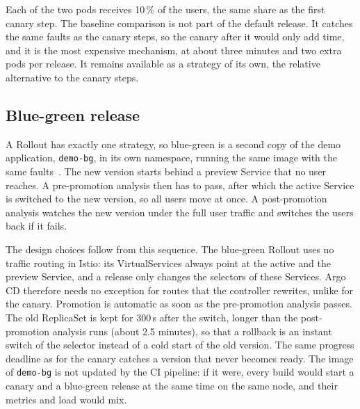 Each of the two pods receives 10\,\% of the users, the same share as the first canary step. The baseline comparison is not part of the default release. It catches the same faults as the canary steps, so the canary after it would only add time, and it is the most expensive mechanism, at about three minutes and two extra pods per release. It remains available as a strategy of its own, the relative alternative to the canary steps.

\subsection{Blue-green release}
\label{sec:DesignBlueGreen}
A Rollout has exactly one strategy, so blue-green is a second copy of the demo application, \texttt{demo-bg}, in its own namespace, running the same image with the same faults~\cite{ArgoRolloutsBlueGreen}. The new version starts behind a preview Service that no user reaches. A pre-promotion analysis then has to pass, after which the active Service is switched to the new version, so all users move at once. A post-promotion analysis watches the new version under the full user traffic and switches the users back if it fails.

The design choices follow from this sequence. The blue-green Rollout uses no traffic routing in Istio: its VirtualServices always point at the active and the preview Service, and a release only changes the selectors of these Services. Argo CD therefore needs no exception for routes that the controller rewrites, unlike for the canary. Promotion is automatic as soon as the pre-promotion analysis passes. The old ReplicaSet is kept for 300\,s after the switch, longer than the post-promotion analysis runs (about 2.5 minutes), so that a rollback is an instant switch of the selector instead of a cold start of the old version. The same progress deadline as for the canary catches a version that never becomes ready. The image of \texttt{demo-bg} is not updated by the CI pipeline: if it were, every build would start a canary and a blue-green release at the same time on the same node, and their metrics and load would mix.

